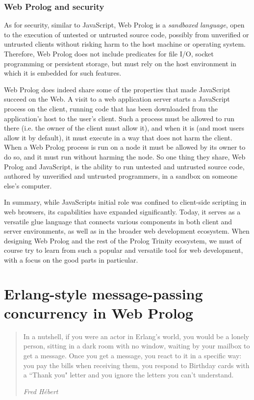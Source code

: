 \subsubsection{Web Prolog and security}\label{sec:web-prolog-and-security}

As for security, similar to JavaScript, Web Prolog is a \textit{sandboxed language}, open to the execution of untested or untrusted source code, possibly from unverified or untrusted clients without risking harm to the host machine or operating system. Therefore, Web Prolog does not include predicates for file I/O, socket programming or persistent storage, but must rely on the host environment in which it is embedded for such features.

Web Prolog does indeed share some of the properties that made JavaScript succeed on the Web. A visit to a web application server starts a JavaScript process on the client, running code that has been downloaded from the application's host to the user's client. Such a process must be allowed to run there (i.e. the owner of the client must allow it), and when it is (and most users allow it by default), it must execute in a way that does not harm the client. When a Web Prolog process is  run on a node it must be allowed by its owner to do so, and it must run without harming the node. So one thing they share, Web Prolog and JavaScript, is the ability to run untested and untrusted source code, authored by unverified and untrusted programmers, in a sandbox on someone else's computer.  

In summary, while JavaScript\textquotesingle s initial role was confined to client-side scripting in web browsers, its capabilities have expanded
significantly. Today, it serves as a versatile glue language that
connects various components in both client and server environments, as
well as in the broader web development ecosystem. When designing Web Prolog and the rest of the Prolog Trinity ecosystem, we must of course try to learn from such a popular and versatile tool for web development, with a focus on the good parts in particular.


\section{Erlang-style message-passing concurrency in Web Prolog}

\begin{quotation}
\noindent In a nutshell, if you were an actor in Erlang's world, you would be a lonely person, sitting in a dark room with no window, waiting by your mailbox to get a message. Once you get a message, you react to it in a specific way: you pay the bills when receiving them, you respond to Birthday cards with a ``Thank you" letter and you ignore the letters you can't understand.

\flushright\textit{Fred H\'ebert}
\vspace{0.1cm}
\end{quotation}
 
